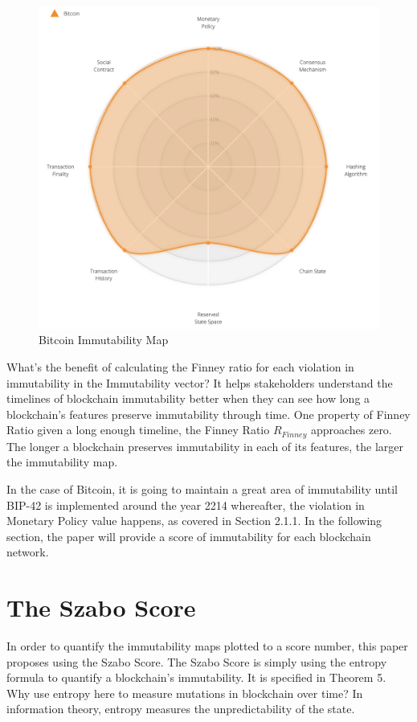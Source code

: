\documentclass{article}
\begin{document}
\begin{figure}
  \centering
  \includegraphics[width=12cm]{btc.png}
  \caption{Bitcoin Immutability Map}
  \label{fig:fig3}
\end{figure}

What’s the benefit of calculating the Finney ratio for each violation in immutability in the Immutability vector? It helps stakeholders understand the timelines of blockchain immutability better when they can see how long a blockchain’s features preserve immutability through time. One property of Finney Ratio given a long enough timeline, the Finney Ratio $R_{Finney}$  approaches zero. The longer a blockchain preserves immutability in each of its features, the larger the immutability map.

In the case of Bitcoin, it is going to maintain a great area of immutability until BIP-42 is implemented around the year 2214 whereafter, the violation in Monetary Policy value happens, as covered in Section 2.1.1. In the following section, the paper will provide a score of immutability for each blockchain network.

\section{The Szabo Score}

In order to quantify the immutability maps plotted to a score number, this paper proposes using the Szabo Score. The Szabo Score is simply using the entropy formula to quantify a blockchain’s immutability. It is specified in Theorem 5. Why use entropy here to measure mutations in blockchain over time? In information theory, entropy measures the unpredictability of the state. 
\end{document}
